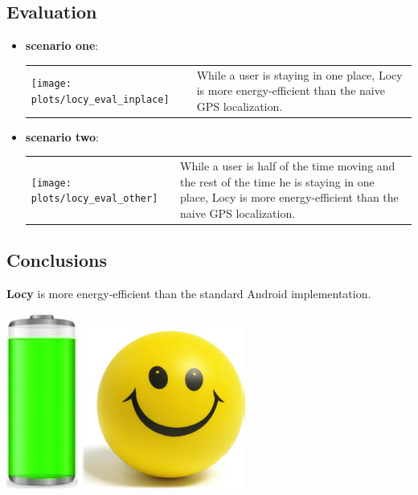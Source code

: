 \documentclass[a2,landscape]{a0poster}
\begin{document}
\mbox{}\framebreak
\begin{center}
\section*{Evaluation}
\end{center}
\begin{itemize}
   \item \textbf{scenario one}:

\begin{tabular}[t]{p{8.0cm} p{8.0cm}}
       \vspace{0cm}\texttt{[image: plots/locy\_eval\_inplace]} &  \vspace{0cm}While a user is staying in one place, Locy is more energy-efficient than the naive GPS localization.
      \end{tabular}
\vspace{0.3cm}
   \item \textbf{scenario two}:

\begin{tabular}[t]{p{8.0cm} p{8.0cm}}
	\vspace{0cm}\texttt{[image: plots/locy\_eval\_other]} &  \vspace{0cm}While a user is half of the time moving and the rest of the time he is staying in one place, Locy is more energy-efficient than the naive GPS localization.
\end{tabular}
  \end{itemize}

\begin{center}
\section*{Conclusions}
\end{center}

\textbf{Locy} is more energy-efficient than the standard Android implementation. 
\vspace{1.25cm}
\begin{center}
\includegraphics[scale=0.7]{plots/full_battery}
\includegraphics[scale=0.7]{plots/happy_face}
\end{center}
\end{document}
